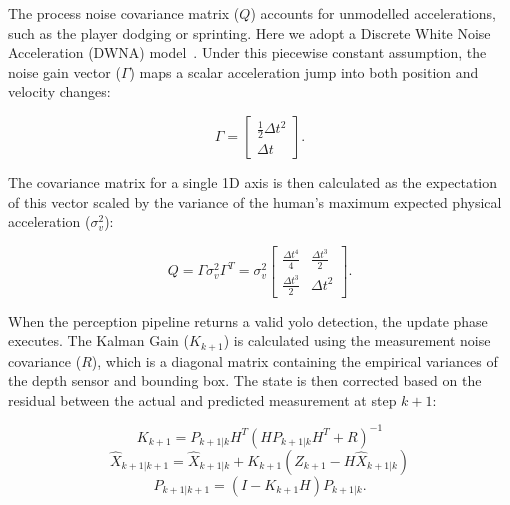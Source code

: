 \documentclass{report_template_oxford}
\begin{document}

The process noise covariance matrix ($Q$) accounts for unmodelled accelerations, such as the player dodging or sprinting. Here we adopt a Discrete White Noise Acceleration (DWNA) model~\cite{barshalom2001kinematic}. Under this piecewise constant assumption, the noise gain vector ($\Gamma$) maps a scalar acceleration jump into both position and velocity changes:

\begin{equation}
    \Gamma = \begin{bmatrix} \frac{1}{2}\Delta t^2 \\ \Delta t \end{bmatrix}.
\end{equation}

The covariance matrix for a single 1D axis is then calculated as the expectation of this vector scaled by the variance of the human's maximum expected physical acceleration ($\sigma_v^2$):

\begin{equation}
    Q = \Gamma \sigma_v^2 \Gamma^T = \sigma_v^2 \begin{bmatrix} \frac{\Delta t^4}{4} & \frac{\Delta t^3}{2} \\ \frac{\Delta t^3}{2} & \Delta t^2 \end{bmatrix}.
\end{equation}

When the perception pipeline returns a valid \gls{yolo} detection, the update phase executes. The Kalman Gain ($K_{k+1}$) is calculated using the measurement noise covariance ($R$), which is a diagonal matrix containing the empirical variances of the depth sensor and bounding box. The state is then corrected based on the residual between the actual and predicted measurement at step $k+1$:

\begin{equation}
    K_{k+1} = P_{k+1|k} H^T (H P_{k+1|k} H^T + R)^{-1}
\end{equation}
\begin{equation}
    \hat{X}_{k+1|k+1} = \hat{X}_{k+1|k} + K_{k+1} (Z_{k+1} - H \hat{X}_{k+1|k})
\end{equation}
\begin{equation}
    P_{k+1|k+1} = (I - K_{k+1} H) P_{k+1|k}.
\end{equation}
\end{document}
